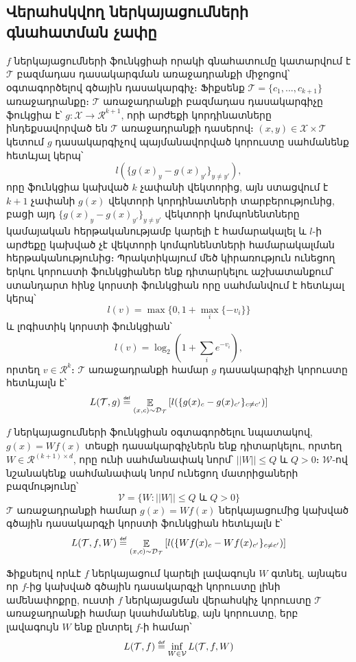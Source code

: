 \documentclass[11pt]{article}
\DeclareMathOperator*{\E}{\mathbb{E}}
\newcommand\defeq{\mathrel{\overset{\makebox[0pt]{\mbox{\normalfont\tiny\sffamily def}}}{=}}}
\begin{document}
\subsection*{Վերահսկվող ներկայացումների գնահատման չափը}
\par $f$ ներկայացումների ֆունկցիաի որակի գնահատումը կատարվում է $\mathcal{T}$ բազմադաս դասակարգման առաջադրանքի միջոցով՝ օգտագործելով գծային դասակարգիչ։  Ֆիքսենք $\mathcal{T} = \{c_1, ..., c_{k+1}\}$ առաջադրանքը։ $\mathcal{T}$ առաջադրանքի բազմադաս դասակարգիչը ֆուկցիա է՝ $g:\mathcal{X} \rightarrow \mathcal{R}^{k+1}$, որի արժեքի կորդինատները ինդեքսավորված են $\mathcal{T}$ առաջադրանքի դասերով։ $(x, y) \in \mathcal{X} \times \mathcal{T}$ կետում $g$ դասակարգիչով պայմանավորված կորուստը սահմանենք հետևյալ կերպ՝
$$l(\{ g(x)_y-g(x)_{y'}\}_{y \neq y'}  ),$$
որը ֆունկցիա կախված $k$ չափանի վեկտորից,  այն ստացվում է $k+1$ չափանի  $g(x)$ վեկտորի կորդինատների տարբերությունից, բացի այդ $\{ g(x)_y-g(x)_{y'}\}_{y \neq y'}$ վեկտորի կոմպոնենտները կամայական հերթականությամբ կարելի է համարակալել և $l$-ի արժեքը կախված չէ վեկտորի կոմպոնենտների համարակալման հերթականությունից։  Պրակտիկայում մեծ կիրառություն ունեցող երկու կորուստի ֆունկցիաներ ենք դիտարկելու աշխատանքում՝ ստանդարտ հինջ կորստի ֆունկցիան որը սահմանվում է հետևյալ կերպ՝
$$l(v) = \max\{0, 1+\max_{i}\{-v_i\}\} $$ և լոգիստիկ կորստի ֆունկցիան՝
$$l(v) = \log_2(1+\sum_{i}{e^{-v_i}}),$$
որտեղ $v \in \mathcal{R}^k$։ $\mathcal{T}$ առաջադրանքի համար $g$ դասակարգիչի կորուստը հետևյալն է՝
$$L(\mathcal{T}, g) \defeq \E_{(x, c) \sim \mathcal{D}_{\mathcal{T}}} \left [ l(\{ g(x)_c-g(x)_{c'}\}_{c \neq c'}  ) \right ]$$

$f$ ներկայացումների ֆունկցիան օգտագործելու նպատակով,  $g(x) = Wf(x)$ տեսքի դասակարգիչներն ենք դիտարկելու, որտեղ $W \in \mathcal{R}^{(k+1)\times d }$, որը ունի սահմանափակ նորմ՝ $||W|| \leq Q \text{ և }Q >0։$
$\mathcal{W}$-ով նշանակենք սահմանափակ նորմ ունեցող մատրիցաների բազմությունը՝
$$\mathcal{V} = \{W: ||W|| \leq Q \text{ և } Q > 0\}$$
 $\mathcal{T}$ առաջադրանքի համար $g(x) = Wf(x)$ ներկայացումից կախված գծային դասակարգչի կորստի ֆունկցիան հետևյալն է՝
$$L(\mathcal{T}, f, W) \defeq \E_{(x, c) \sim \mathcal{D}_{\mathcal{T}}} \left [ l(\{ Wf(x)_c-Wf(x)_{c'}\}_{c \neq c'}  ) \right ]$$
 
 Ֆիքսելով որևէ $f$ ներկայացում կարելի լավագույն $W$ գտնել, այնպես որ $f$-ից կախված գծային դասակարգչի կորուստը լինի ամենափոքրը, ուստի $f$ ներկայացման վերահսկիչ կորուստը $\mathcal{T}$ առաջադրանքի համար կսահմանենք, այն կորուստը, երբ լավագույն $W$ ենք ընտրել $f$-ի համար՝
 $$L(\mathcal{T}, f) \defeq \inf_{W \in \mathcal{V}} L(\mathcal{T}, f, W)$$
\end{document}

